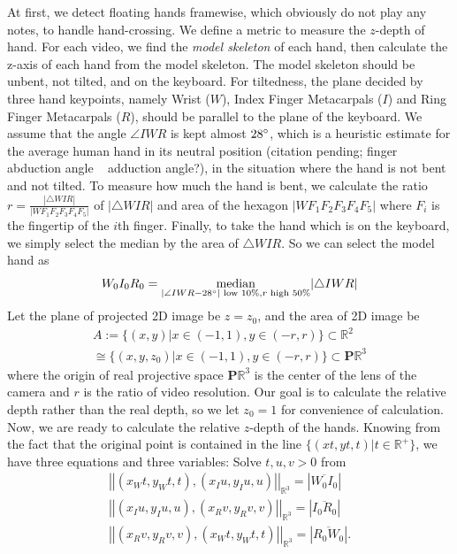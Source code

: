 \documentclass{article}
\begin{document}
At first, we detect floating hands framewise, which obviously do not play any notes, to handle hand-crossing. We define a metric to measure the $z$-depth of hand. For each video, we find the \textit{model skeleton} of each hand, then calculate the z-axis of each hand from the model skeleton. The model skeleton should be unbent, not tilted, and on the keyboard. For tiltedness, the plane decided by three hand keypoints, namely Wrist ($W$), Index Finger Metacarpals ($I$) and Ring Finger Metacarpals ($R$), should be parallel to the plane of the keyboard. We assume that the angle $\angle IWR$ is kept almost $28\degree$, which is a heuristic estimate for the average human hand in its neutral position (citation pending; finger abduction angle ~ adduction angle?), in the situation where the hand is not bent and not tilted. To measure how much the hand is bent, we calculate the ratio $r=\frac{|\triangle WIR|}{|WF_{1}F_{2}F_{3}F_{4}F_{5}|}$ of $|\triangle WIR|$ and area of the hexagon $|WF_{1}F_{2}F_{3}F_{4}F_{5}|$ where $F_i$ is the fingertip of the $i$th finger. Finally, to take the hand which is on the keyboard, we simply select the median by the area of $\triangle WIR$. So we can select the model hand as
\begin{equation}
    W_{0}I_{0}R_{0}=\underset{|\angle IWR - 28\degree| \text{ low 10\%}, r \text{ high 50\%}}{\text{median}}|\triangle IWR|
\end{equation}
Let the plane of projected 2D image be $z=z_{0}$, and the area of 2D image be
\begin{equation}
  \begin{aligned}
    A:=\{(x,y)  | x\in (-1,1), y\in (-r,r)\} \subset \mathbb{R}^2
    \\\cong\{(x,y,z_{0})|x\in(-1,1), y\in (-r,r)\}\subset \mathbf{P}\mathbb{R}^3
\end{aligned}  
\end{equation}
where the origin of real projective space $\mathbf{P}\mathbb{R}^3$ is the center of the lens of the camera and $r$ is the ratio of video resolution. Our goal is to calculate the relative depth rather than the real depth, so we let $z_{0}=1$ for convenience of calculation. \\
Now, we are ready to calculate the relative $z$-depth of the hands. Knowing from the fact that the original point is contained in the line $\{(xt,yt,t) | t\in \mathbb{R^{+}}\}$, we have three equations and three variables: Solve $t,u,v>0$ from
\begin{gather}
    \left||(x_{W}t,y_{W}t,t),(x_{I}u,y_{I}u,u)|\right|_{\mathbb{R}^3}=\left|\overline{W_{0}I_{0}}\right| \\
    \left||(x_{I}u,y_{I}u,u),(x_{R}v,y_{R}v,v)|\right|_{\mathbb{R}^3}=\left|\overline{I_{0}R_{0}}\right| \\
    \left||(x_{R}v,y_{R}v,v),(x_{W}t,y_{W}t,t)|\right|_{\mathbb{R}^3}=\left|\overline{R_{0}W_{0}}\right|.
\end{gather}
\end{document}
